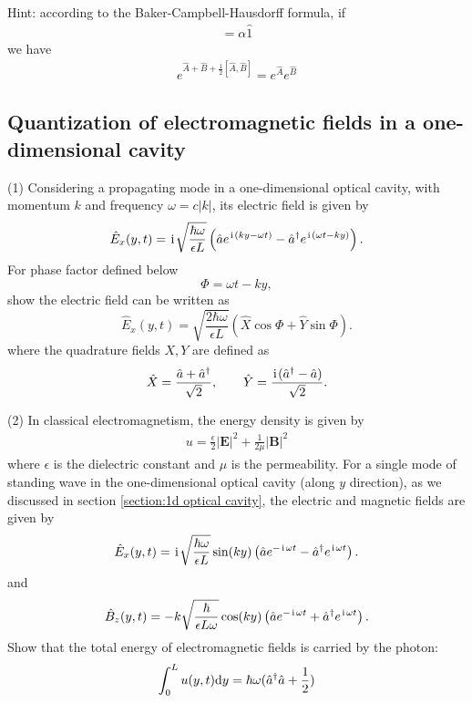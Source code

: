 Hint: according to the Baker-Campbell-Hausdorff formula, if 
\begin{align}
[\hat A,\hat B]=\alpha\hat 1
\end{align}
we have
\begin{align}
e^{\hat A+\hat B+\frac12[\hat A,\hat B]}=e^{\hat A}e^{\hat B}
\end{align}

\subsection{Quantization of electromagnetic fields in a one-dimensional cavity}

(1) Considering a propagating mode in a one-dimensional optical cavity, with momentum $k$ and frequency $\omega=c|k|$, its electric field is given by
\begin{equation}
 \hat E_x(y,t)=
 \hspace{1pt}\mathrm{i}\hspace{1pt}\sqrt{\frac{\hbar\omega}{\epsilon L}}
 \left(\hat a e^{\hspace{1pt}\mathrm{i}\hspace{1pt}(ky-\omega t)}
 -\hat a^\dagger e^{\hspace{1pt}\mathrm{i}\hspace{1pt}(\omega t-ky)}\right).
\end{equation}
For phase factor defined below
\begin{equation}
\Phi=\omega t-ky,
\end{equation}
show the electric field can be written as 
\begin{equation}
\hat E_x(y,t)=\sqrt{\frac{2\hbar\omega}{\epsilon L}}
\left(\hat X\cos\Phi+\hat Y\sin\Phi\right).
\end{equation}
where the quadrature fields $X,Y$ are defined as
\begin{equation}
\hat X=\frac{\hat a+\hat a^\dagger}{\sqrt2},
\qquad
\hat Y=\frac{\hspace{1pt}\mathrm{i}\hspace{1pt}(\hat a^\dagger-\hat a)}{\sqrt2}.
\end{equation}

(2) In classical electromagnetism, the energy density is given by
\begin{align}
    u=\frac{\epsilon}{2}|\textbf{E}|^2+\frac{1}{2\mu}|\textbf{B}|^2
\end{align}
where $\epsilon$ is the dielectric constant and $\mu$ is the permeability. For a single mode of standing wave in the one-dimensional optical cavity (along $y$ direction), as we discussed in section \ref{section:1d optical cavity}, the electric and magnetic fields are given by
\begin{equation}\label{hw10:electric field}
 {
 \hat E_x(y,t)=\hspace{1pt}\mathrm{i}\hspace{1pt}\sqrt{\frac{\hbar\omega}{\epsilon L}}
 \sin(ky)
 \left(\hat a e^{-\hspace{1pt}\mathrm{i}\hspace{1pt}\omega t}
 -\hat a^\dagger e^{\hspace{1pt}\mathrm{i}\hspace{1pt}\omega t}\right).}
\end{equation}
and
\begin{equation}\label{hw10:magnetic field}
{
 \hat B_z(y,t)=-
 k\sqrt{\frac{\hbar}{\epsilon L\omega}}
 \cos(ky)
 \left(\hat a e^{-\hspace{1pt}\mathrm{i}\hspace{1pt}\omega t}
 +\hat a^\dagger e^{\hspace{1pt}\mathrm{i}\hspace{1pt}\omega t}\right).}
\end{equation}
Show that the total energy of electromagnetic fields is carried by the photon:
\begin{align}
    \int_0^L u(y,t)\mathrm{d}{y}=\hbar\omega (\hat a^\dagger\hat a+\frac12)
\end{align}


